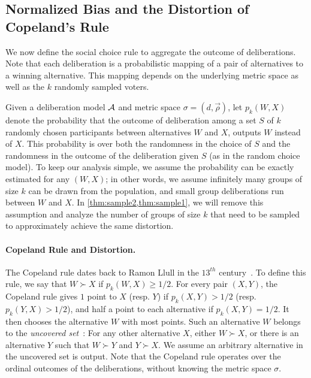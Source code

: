
\subsection{Normalized Bias and the Distortion of Copeland's Rule}
\label{sec:copeland}
We now define the social choice rule to aggregate the outcome of deliberations. Note that each deliberation is a probabilistic mapping of a pair of alternatives to a winning alternative. This mapping depends on the underlying metric space as well as the $k$ randomly sampled voters. %

Given a deliberation model $\mathcal{A}$ and metric space $\sigma = (d, \vec{\rho})$, let $p_k(W,X)$ denote the probability that the outcome of deliberation among a set $S$ of $k$ randomly chosen participants between alternatives $W$ and $X$, outputs $W$ instead of $X$. This probability is over both the randomness in the choice of $S$ and the randomness in the outcome of the deliberation given $S$ (as in the random choice model). To keep our analysis simple, we assume the probability can be exactly estimated for any $(W,X)$; in other words, we assume infinitely many groups of size $k$ can be drawn from the population, and small group deliberations  run  between $W$ and $X$.  In \cref{thm:sample2,thm:sample1}, we will remove this assumption and analyze the number of groups of size $k$ that need to be sampled to approximately achieve the same distortion.

\paragraph{Copeland Rule and Distortion.} The Copeland rule dates back to Ramon Llull in the $13^{th}$ century~\cite{voting-book}. To define this rule, we say that $W \succ X$ if $p_k(W,X) \ge 1/2$.  %
For every pair $(X,Y)$, the Copeland rule gives $1$ point to $X$ (resp. $Y$) if $p_k(X,Y) > 1/2$ (resp. $p_k(Y,X) > 1/2$), and half a point to each alternative if $p_k(X,Y) = 1/2$. It then chooses the alternative $W$ with most points.  Such an alternative $W$ belongs to the {\em uncovered set}~\cite{landau}: For any other alternative $X$, either $W \succ X$, or there is an alternative $Y$ such that $W \succ Y$ and $Y \succ X$. We assume an arbitrary alternative in the uncovered set is output. Note that the Copeland rule operates over the ordinal outcomes of the deliberations, without knowing the metric space $\sigma$.


